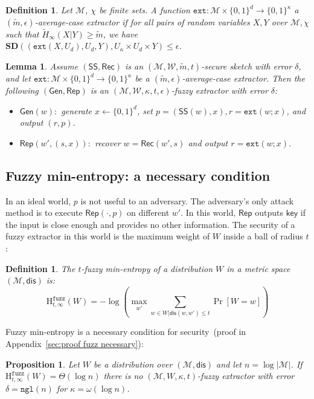 \documentclass[11pt]{article}
\newcommand{\apref}[1]{\mbox{Appendix~\ref{#1}}}
\newcommand{\class}[1]{{\ensuremath{\mathsf{#1}}}}
\newcommand{\key}{\ensuremath{\class{key}}\xspace}
\newcommand{\gen}{\ensuremath{\class{Gen}}\xspace}
\newcommand{\rep}{\ensuremath{\class{Rep}}\xspace}
\newcommand{\sketch}{\ensuremath{\class{SS}}\xspace}
\newcommand{\rec}{\ensuremath{\class{Rec}}\xspace}
\newcommand{\zo}{\ensuremath{\{0, 1\}}}
\newcommand{\dis}{\ensuremath{\mathsf{dis}}}
\newcommand{\ngl}{\ensuremath{\mathtt{ngl}}\xspace}
\newcommand{\Hfuzz}{\mathrm{H}^{\mathtt{fuzz}}_{t,\infty}}
\newcommand{\ext}{\ensuremath{\mathtt{ext}}}
\newcommand{\sd}{\ensuremath{\mathbf{SD}}}
\newtheorem{lemma}[theorem]{Lemma}
\newtheorem{proposition}[theorem]{Proposition}
\newtheorem{definition}[theorem]{Definition}
\begin{document}
\begin{definition}
Let $\mathcal{M}$, $\chi$ be finite sets.
A function $\ext: \mathcal{M}\times \{0,1\}^d \rightarrow \{0,1\}^\kappa$ a \emph{$(\tilde{m}, \epsilon)$-average-case extractor} if for all pairs
of random variables $X, Y$ over $\mathcal{M}, \chi$ such that
$\tilde{H}_\infty(X|Y) \ge \tilde{m}$, we have $\sd((\ext(X, U_d), U_d, Y), U_\kappa\times
U_d \times Y) \le \epsilon$.
\end{definition}

\begin{lemma}
\label{lem:fuzzy ext construction}
Assume $(\sketch, \rec)$ is an $(\mathcal{M}, \mathcal{W}, \tilde{m}, t)$-secure sketch with error $\delta$, and let $\ext:\mathcal{M}\times \zo^d \rightarrow \zo^\kappa$ be a $(\tilde{m}, \epsilon)$-average-case extractor.  Then the following $(\gen, \rep)$ is an $(\mathcal{M}, \mathcal{W}, \kappa, t, \epsilon)$-fuzzy extractor with error $\delta$:
\begin{itemize}
\item $\gen(w):$ generate $x\leftarrow \zo^d$, set $p=(\sketch(w), x), r=\ext(w;x)$, and output $(r,p)$.
\item $\rep(w', (s, x)):$ recover $w=\rec(w',s)$ and output $r=\ext(w;x)$.
\end{itemize}
\end{lemma}

\subsection{Fuzzy min-entropy: a necessary condition}
\label{sec:minimal conditions}

In an ideal world, $p$ is not useful to an adversary.  The adversary's only attack method is to execute $\rep(\cdot, p)$ on different $w'$.  In this world, $\rep$ outputs $\key$ if the input is close enough and provides no other  information.  The security of a fuzzy extractor in this world is the maximum weight of $W$ inside a ball of radius $t$:

\begin{definition}
\label{def:fuzzy min-ent}
The $t$-fuzzy min-entropy of a distribution $W$ in a metric space $(\mathcal{M}, \dis)$ is:
\[
\Hfuzz(W) = -\log \left(\max_{w'}  \sum_{w\in W | \dis(w, w')\le t} \Pr[W=w] \right)
\]
\end{definition}
\noindent
Fuzzy min-entropy is a necessary condition for security~(proof in \apref{sec:proof fuzz necessary}):
\begin{proposition}
\label{prop:fuzz necessary}
Let $W$ be a distribution over $(\mathcal{M}, \dis)$ and let $n= \log |\mathcal{M}|$.
If $\Hfuzz (W) = \Theta(\log n)$ there is no $(\mathcal{M}, W, \kappa, t)$-fuzzy extractor %
 with error $\delta = \ngl(n)$ for $\kappa =\omega(\log n)$.
\end{proposition}
\end{document}
